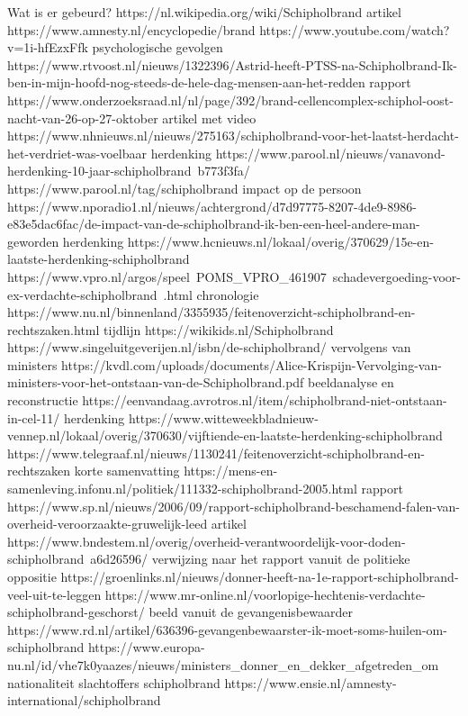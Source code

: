 Wat is er gebeurd?
https://nl.wikipedia.org/wiki/Schipholbrand
artikel
https://www.amnesty.nl/encyclopedie/brand
https://www.youtube.com/watch?v=1i-hfEzxFfk
psychologische gevolgen
https://www.rtvoost.nl/nieuws/1322396/Astrid-heeft-PTSS-na-Schipholbrand-Ik-ben-in-mijn-hoofd-nog-steeds-de-hele-dag-mensen-aan-het-redden
rapport
https://www.onderzoeksraad.nl/nl/page/392/brand-cellencomplex-schiphol-oost-nacht-van-26-op-27-oktober
artikel met video
https://www.nhnieuws.nl/nieuws/275163/schipholbrand-voor-het-laatst-herdacht-het-verdriet-was-voelbaar
herdenking
https://www.parool.nl/nieuws/vanavond-herdenking-10-jaar-schipholbrand~b773f3fa/
https://www.parool.nl/tag/schipholbrand
impact op de persoon
https://www.nporadio1.nl/nieuws/achtergrond/d7d97775-8207-4de9-8986-e83e5dac6fac/de-impact-van-de-schipholbrand-ik-ben-een-heel-andere-man-geworden
herdenking
https://www.hcnieuws.nl/lokaal/overig/370629/15e-en-laatste-herdenking-schipholbrand
https://www.vpro.nl/argos/speel~POMS_VPRO_461907~schadevergoeding-voor-ex-verdachte-schipholbrand~.html
chronologie
https://www.nu.nl/binnenland/3355935/feitenoverzicht-schipholbrand-en-rechtszaken.html
tijdlijn
https://wikikids.nl/Schipholbrand
https://www.singeluitgeverijen.nl/isbn/de-schipholbrand/
vervolgens van ministers
https://kvdl.com/uploads/documents/Alice-Krispijn-Vervolging-van-ministers-voor-het-ontstaan-van-de-Schipholbrand.pdf
beeldanalyse en reconstructie
https://eenvandaag.avrotros.nl/item/schipholbrand-niet-ontstaan-in-cel-11/
herdenking
https://www.witteweekbladnieuw-vennep.nl/lokaal/overig/370630/vijftiende-en-laatste-herdenking-schipholbrand
https://www.telegraaf.nl/nieuws/1130241/feitenoverzicht-schipholbrand-en-rechtszaken
korte samenvatting
https://mens-en-samenleving.infonu.nl/politiek/111332-schipholbrand-2005.html
rapport
https://www.sp.nl/nieuws/2006/09/rapport-schipholbrand-beschamend-falen-van-overheid-veroorzaakte-gruwelijk-leed
artikel
https://www.bndestem.nl/overig/overheid-verantwoordelijk-voor-doden-schipholbrand~a6d26596/
verwijzing naar het rapport vanuit de politieke oppositie
https://groenlinks.nl/nieuws/donner-heeft-na-1e-rapport-schipholbrand-veel-uit-te-leggen
https://www.mr-online.nl/voorlopige-hechtenis-verdachte-schipholbrand-geschorst/
beeld vanuit de gevangenisbewaarder
https://www.rd.nl/artikel/636396-gevangenbewaarster-ik-moet-soms-huilen-om-schipholbrand
https://www.europa-nu.nl/id/vhe7k0yaazes/nieuws/ministers_donner_en_dekker_afgetreden_om
nationaliteit slachtoffers schipholbrand
https://www.ensie.nl/amnesty-international/schipholbrand
